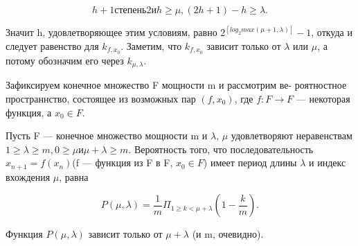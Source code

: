 \documentclass{../template/mai_book}
\begin{document}
$$h + 1 степень 2 и h \geqslant \mu, (2h + 1) - h \geqslant \lambda.$$ \par 
\noindent Значит h, удовлетворяющее этим условиям, равно $2^{[log_{2}max(\mu + 1,\lambda)]} - 1$, \linebreak откуда и следует равенство для $k_{f,x_{0}}$. Заметим, что $k_{f,x_{0}}$ зависит только \linebreak от $\lambda$ или $\mu$, а потому обозначим его через $k_{\mu, \lambda}$. \par 
Зафиксируем конечное множество F мощности m и рассмотрим ве- \linebreak роятностное пространнство, состоящее из возможных пар $(f, x_{0})$, где \linebreak $f: F \to F$ --- некоторая функция, а $x_{0} \in F$. \par 

\begin{lemma}
Пусть F --- конечное множество мощности m и $\lambda$, $\mu$ удовлетворяют \linebreak неравенствам $1 \geqslant \lambda \geqslant m, 0 \geqslant \mu и \mu + \lambda \geqslant m$. Вероятность того, \linebreak что последовательность $x_{n+1} = f(x_{n})$(f --- функция из F в F, $x_{0} \in F$) \linebreak имеет   период длины $\lambda$ и индекс вхождения $\mu$, равна \par 

$$P(\mu, \lambda)=\frac{1}{m} \Pi_{1\geqslant k<\mu+\lambda} (1 - \frac{k}{m}).$$ \par 
\noindent Функция $P(\mu,\lambda)$ зависит только от $\mu + \lambda$ (и m, очевидно). \end{lemma}
\newpage 
\end{document}
